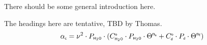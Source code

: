{%
%
%
% 
%
%
%
%
%
%
%
%
\label{levelb:ContAbsMod}

There should be some general introduction here.

The headings here are tentative, TBD by Thomas.
\begin{equation} 
  \label{eq:r98:cont}
  \alphac = \nu^2 \cdot \phzo \cdot 
            (\cso \cdot \phzo \cdot \Theta^{\xs} + 
             \cdo \cdot \pda  \cdot \Theta^{\xf})
\end{equation}

}
